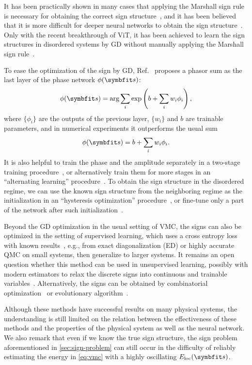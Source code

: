 It has been practically shown in many cases that applying the Marshall sign rule is necessary for obtaining the correct sign structure~\cite{carleo2017solving, choo2019two, bukov2021learning, li2022bridging}, and it has been believed that it is more difficult for deeper neural networks to obtain the sign structure~\cite{szabo2020neural}. Only with the recent breakthrough of ViT, it has been achieved to learn the sign structures in disordered systems by GD without manually applying the Marshall sign rule~\cite{viteritti2023transformer, viteritti2023transformer2}.

To ease the optimization of the sign by GD, Ref.~\cite{szabo2020neural} proposes a phasor sum as the last layer of the phase network $\phi(\vs)$:
\begin{equation}
\phi(\vs) = \arg \sum_i \exp\left( b + \sum_i w_i \phi_i \right),
\label{eq:phasor-sum}
\end{equation}
where $\{\phi_i\}$ are the outputs of the previous layer, $\{w_i\}$ and $b$ are trainable parameters, and in numerical experiments it outperforms the usual sum
\begin{equation}
\phi(\vs) = b + \sum_i w_i \phi_i.
\end{equation}
It is also helpful to train the phase and the amplitude separately in a two-stage training procedure~\cite{szabo2020neural}, or alternatively train them for more stages in an ``alternating learning'' procedure~\cite{astrakhantsev2021broken}. To obtain the sign structure in the disordered regime, we can use the known sign structure from the neighboring regime as the initialization in an ``hysteresis optimization'' procedure~\cite{astrakhantsev2021broken}, or fine-tune only a part of the network after such initialization~\cite{rende2024fine}.

Beyond the GD optimization in the usual setting of VMC, the signs can also be optimized in the setting of supervised learning, which uses a cross entropy loss with known results~\cite{park2022expressive}, e.g., from exact diagonalization (ED) or highly accurate QMC on small systems, then generalize to larger systems. It remains an open question whether this method can be used in unsupervised learning, possibly with modern estimators to relax the discrete signs into continuous and trainable variables~\cite{maddison2017concrete, jang2017categorical, tucker2017rebar, grathwohl2018backpropagation}. Alternatively, the signs can be obtained by combinatorial optimization~\cite{westerhout2023many} or evolutionary algorithm~\cite{chen2022neural}.

Although these methods have successful results on many physical systems, the understanding is still limited on the relation between the effectiveness of these methods and the properties of the physical system as well as the neural network. We also remark that even if we know the true sign structure, the sign problem aforementioned in \cref{sec:sign-problem} can still occur in the difficulty of reliably estimating the energy in \cref{eq:vmc} with a highly oscillating $E_\text{loc}(\vs)$.
